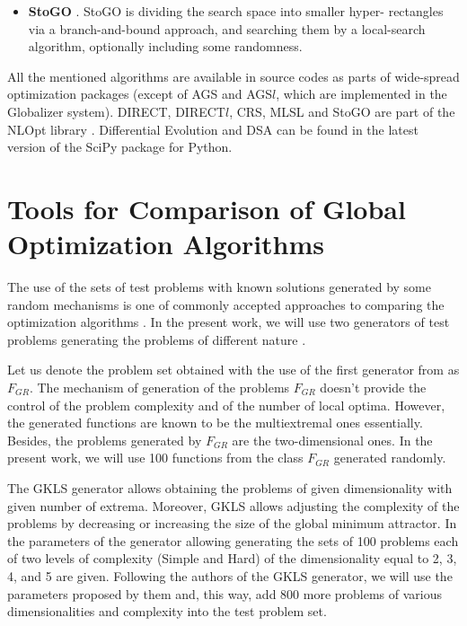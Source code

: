 \documentclass[runningheads]{llncs}
\begin{document}
\begin{itemize}
  \item \textbf{StoGO} \cite{Madsen1998}. StoGO is dividing the search space into smaller hyper-
rectangles via a branch-and-bound approach,
  and searching them by a local-search algorithm, optionally including some randomness.

\end{itemize}

All the mentioned algorithms are available in source codes as parts of wide-spread optimization packages (except of AGS and AGS\(l\), which are implemented in the Globalizer system).
DIRECT, DIRECT$l$, CRS, MLSL and StoGO are part of the NLOpt library \cite{nlopt}.
Differential Evolution and DSA can be found in
the latest version of the SciPy \cite{scipy} package for Python.

\section{Tools for Comparison of Global Optimization Algorithms}


The use of the sets of test problems with known solutions generated by some random mechanisms is
one of commonly accepted approaches to comparing the optimization algorithms
\cite{Beiranvand2017}. In the present work, we will use two generators of test problems generating
the problems of different nature \cite{grishaginClass, Gaviano2003}.

Let us denote the problem set obtained with the use of the first generator from \cite{grishaginClass}
as \(F_{GR}\). The mechanism of generation of the problems \(F_{GR}\) doesn't provide the
control of the problem complexity and of the number of local optima. However, the generated
functions are known to be the multiextremal ones essentially. Besides, the problems generated by
\(F_{GR}\) are the two-dimensional ones. In the present work, we will use 100 functions from the
class \(F_{GR}\) generated randomly.

The GKLS generator \cite{Gaviano2003} allows obtaining the problems of given dimensionality
with given number of extrema. Moreover, GKLS allows adjusting the complexity of the problems by
decreasing or increasing the size of the global minimum attractor. In
\cite{SergeyevKvasov2006} the parameters of the generator allowing generating the sets of 100
problems each of two levels of complexity (Simple and Hard) of the dimensionality equal to 2, 3, 4,
and 5 are given. Following the authors of the GKLS generator, we will use the parameters proposed
by them and, this way, add 800 more problems of various dimensionalities and complexity into the
test problem set.
\end{document}
